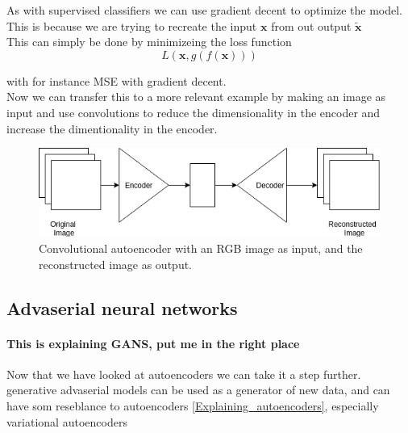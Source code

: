 As with supervised classifiers we can use gradient decent to optimize the model. This is because we are trying to recreate the input $\textbf{x}$ from out output $\widetilde{\textbf{x}}$\\
	  
This can simply be done by minimizeing the loss function\\
\begin{equation}
	L(\textbf{x},g(f(\textbf{x})))
\end{equation}

with for instance MSE with gradient decent. \\
Now we can transfer this to a more relevant example by making an image as input and use convolutions to reduce the dimensionality in the encoder and increase the dimentionality in the encoder.
\begin{figure}[t]
	\centering
	\includegraphics[scale=0.5]{background/figures/CAE.png}
	\caption{Convolutional autoencoder with an RGB image as input, and the reconstructed image as output.}
\end{figure}
	
\subsection{Advaserial neural networks}
\paragraph{This is explaining GANS, put me in the right place} %
Now that we have looked at autoencoders we can take it a step further. 
generative advaserial models can be used as a generator of new data, and can have som reseblance to autoencoders \ref{Explaining_autoencoders}, especially variational autoencoders %


